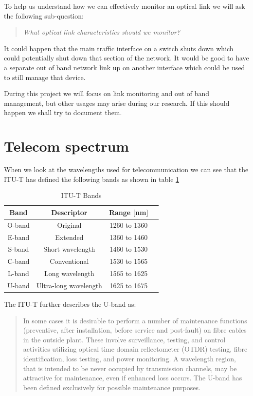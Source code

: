 \documentclass{article}
\begin{document}
To help us understand how we can effectively monitor an optical link we will ask the following sub-question:
\begin{quote}
\textit{
What optical link characteristics should we monitor?
}
\end{quote}

It could happen that the main traffic interface on a switch shuts down which could potentially shut down that section of the network.
It would be good to have a separate out of band network link up on another interface which could be used to still manage that device.

During this project we will focus on link monitoring and out of band management, but other usages may arise during our research.
If this should happen we shall try to document them.

\newpage
\section{Telecom spectrum}
When we look at the wavelengths used for telecommunication we can see that the ITU-T has defined the following bands as shown in table \ref{tab:bands}
\begin{table}[h]
\centering
\begin{tabular}{|c|c|c|c|}
\hline 
\textbf{Band} & \textbf{Descriptor} & \textbf{Range [nm]}\\ 
\hline 
O-band & Original & 1260 to 1360 \\ 
\hline 
E-band & Extended & 1360 to 1460 \\ 
\hline 
S-band & Short wavelength & 1460 to 1530 \\ 
\hline 
C-band & Conventional & 1530 to 1565 \\ 
\hline 
L-band & Long wavelength & 1565 to 1625 \\ 
\hline 
U-band & Ultra-long wavelength & 1625 to 1675 \\ 
\hline 
\end{tabular} 
\caption{ITU-T Bands\cite[p. 134]{itu-t:manual2009}
\label{tab:bands}
}
\end{table}

The ITU-T further describes the U-band as:
\begin{quote}
In some cases it is desirable to perform a number of maintenance functions (preventive, after
installation, before service and post-fault) on fibre cables in the outside plant. These involve
surveillance, testing, and control activities utilizing optical time domain reflectometer (OTDR)
testing, fibre identification, loss testing, and power monitoring. A wavelength region, that is
intended to be never occupied by transmission channels, may be attractive for maintenance,
even if enhanced loss occurs. The U-band has been defined exclusively for possible
maintenance purposes.
\end{quote}
\end{document}
